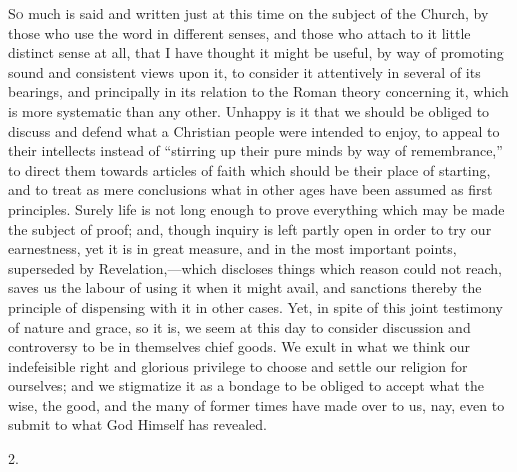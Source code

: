 S\textsc{o} much is said and written just at this time on the subject of
the Church, by those who use the word in different senses, and those
who attach to it little distinct sense at all, that I have thought it
might be useful, by way of promoting sound and consistent views upon
it, to consider it attentively in several of its bearings, and
principally in its relation to the Roman theory concerning it, which
is more systematic than any other. Unhappy is it that we should be
obliged to discuss and defend what a Christian people were intended to
enjoy, to appeal to their intellects instead of ``stirring up
their pure minds by way of remembrance,'' to direct them towards
articles of faith which should be their place of starting, and to
treat as mere conclusions what in other ages have been assumed as
first principles. Surely life is not long enough to prove everything
which may be made the subject of proof; and, though inquiry is left
partly open in order to try our earnestness, yet it is in great
measure, and in the most important points, superseded by Revelation,—which
discloses things which reason could not reach, saves us the labour of
using it when it might avail, and sanctions thereby the principle of
dispensing with it in other cases. Yet, in spite of this joint
testimony of nature and grace, so it is, we seem at this day to
consider discussion and controversy to be in themselves chief goods.
We exult in what we think our indefeisible right and glorious
privilege to choose and settle our religion for ourselves; and we
stigmatize it as a bondage to be obliged to accept what the wise, the
good, and the many of former times have made over to us, nay, even to
submit to what God Himself has revealed.

2.

